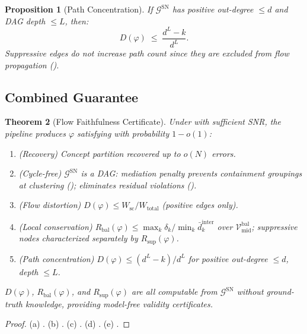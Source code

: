 \documentclass[11pt]{article}
\newtheorem{theorem}{Theorem}[section]
\newtheorem{proposition}[theorem]{Proposition}
\newcommand{\cG}{\mathcal{G}}
\newcommand{\cV}{\mathcal{V}}
\newcommand{\1}{\mathbbm{1}}
\newcommand{\Rbal}{R_{\mathrm{bal}}(\varphi)}
\newcommand{\Rsup}{R_{\mathrm{sup}}(\varphi)}
\begin{document}
\begin{proposition}[Path Concentration]
\label{prop:path-concentration}
  If $\cG^{\mathrm{SN}}$ has positive out-degree $\le d$ and DAG depth $\le L$, then:
  \begin{equation}
    D(\varphi) \;\le\; \frac{d^L - k}{d^L}.
  \end{equation}
  Suppressive edges do not increase path count since they are excluded from flow propagation ().
\end{proposition}

\subsection{Combined Guarantee}
\label{sec:combined-guarantee}

\begin{theorem}[Flow Faithfulness Certificate]
\label{thm:main}
  Under  with sufficient SNR, the pipeline produces $\varphi$ satisfying with probability $1 - o(1)$:
  \begin{enumerate}[label=(\alph*)]
    \item \emph{(Recovery)} Concept partition recovered up to $o(N)$ errors.
    \item \emph{(Cycle-free)} $\cG^{\mathrm{SN}}$ is a DAG: mediation penalty prevents containment groupings at clustering ();  eliminates residual violations ().
    \item \emph{(Flow distortion)} $D(\varphi) \le W_{\mathrm{sc}} / W_{\mathrm{total}}$ (positive edges only).
    \item \emph{(Local conservation)} $\Rbal \le \max_k \delta_k / \min_k \bar{d}^{\mathrm{inter}}_k$ over $\cV^{\mathrm{bal}}_{\mathrm{mid}}$; suppressive nodes characterized separately by $\Rsup$.
    \item \emph{(Path concentration)} $D(\varphi) \le (d^L - k)/d^L$ for positive out-degree $\le d$, depth $\le L$.
  \end{enumerate}
  $D(\varphi)$, $\Rbal$, and $\Rsup$ are all computable from $\cG^{\mathrm{SN}}$ without ground-truth knowledge, providing model-free validity certificates.
\end{theorem}

\begin{proof}
  (a) . (b) . (c) . (d) . (e) .
\end{proof}
\end{document}
